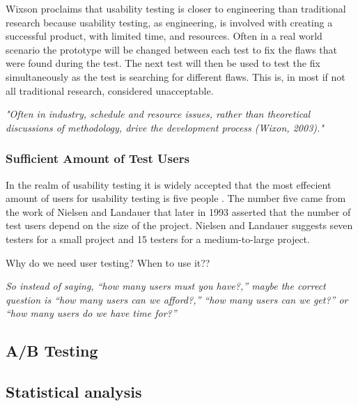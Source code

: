 Wixson proclaims that usability testing is closer to engineering than traditional research because usability testing, as engineering, is involved with creating a successful product, with limited time, and resources. Often in a real world scenario the prototype will be changed between each test to fix the flaws that were found during the test. The next test will then be used to test the fix simultaneously as the test is searching for different flaws. This is, in most if not all traditional research, considered unacceptable. 

\textit{"Often in industry, schedule and resource issues, rather than theoretical discussions of methodology, drive the development process (Wixon, 2003)."}

\subsubsection{Sufficient Amount of Test Users}%
\label{ssub:Sufficient Amount of Test Users}
In the realm of usability testing it is widely accepted that the most effecient amount of users for usability testing is five people \cite{nielsen1993mathematical}. The number five came from the work of Nielsen and Landauer that later in 1993 asserted that the number of test users depend on the size of the project\cite{lazar2017research}. Nielsen and Landauer suggests seven testers for a small project and 15 testers for a medium-to-large project. 

Why do we need user testing?
When to use it??

\textit{
So instead of saying, “how many users must you have?,” maybe the correct question is “how many users can we afford?,” “how many users can we get?” or “how many users do we have time for?”
} \cite{lazar2017research} 



\cite{nielsen1994estimating} 

\cite{nielsen1994heuristic} 


\subsection{A/B Testing}%
\label{sub:A/B Testing}


\subsection{Statistical analysis}%
\label{sub:Statistical analysis}

